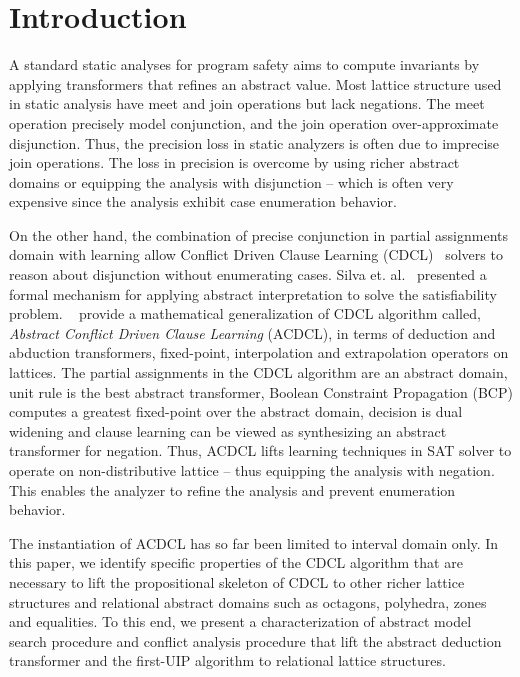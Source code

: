 \section{Introduction}
%
A standard static analyses for program safety aims to compute 
invariants by applying transformers that refines an abstract 
value.  Most lattice structure used in static analysis have 
meet and join operations but lack negations.  The meet operation 
precisely model conjunction, and the join operation over-approximate 
disjunction. Thus, the precision loss in static analyzers is often 
due to imprecise join operations. The loss in precision is overcome 
by using richer abstract domains or equipping the analysis with disjunction --
which is often very expensive since the analysis exhibit case enumeration 
behavior. 


On the other hand, the combination of precise conjunction in partial assignments 
domain with learning allow Conflict Driven Clause Learning (CDCL)~\cite{cdcl} 
solvers to reason about disjunction without enumerating cases.  
Silva et. al.~\cite{tacas12, sas12, dhk2013-popl} presented 
a formal mechanism for applying abstract interpretation to solve the 
satisfiability problem.  ~\cite{sas12} provide a mathematical generalization 
of CDCL algorithm called, {\em Abstract Conflict Driven Clause Learning} (ACDCL), 
in terms of deduction and abduction transformers, fixed-point, interpolation 
and extrapolation operators on lattices.  The partial assignments in the 
CDCL algorithm are an abstract domain, unit rule is the best abstract 
transformer,  Boolean Constraint Propagation (BCP) computes a greatest fixed-point 
over the abstract domain, decision is dual widening and clause learning can be 
viewed as synthesizing an abstract transformer for negation.  Thus, ACDCL 
lifts learning techniques in SAT solver to operate on non-distributive 
lattice -- thus equipping the analysis with negation. This enables the 
analyzer to refine the analysis and prevent enumeration behavior.

The instantiation of ACDCL has so far been limited to interval domain only.  In this paper, 
we identify specific properties of the CDCL algorithm that are necessary to 
lift the propositional skeleton of CDCL to other richer lattice structures 
and relational abstract domains such as octagons, polyhedra, zones and equalities.  
To this end, we present a characterization of abstract model search procedure and 
conflict analysis procedure that lift the abstract deduction transformer and the 
first-UIP algorithm to relational lattice structures.  
